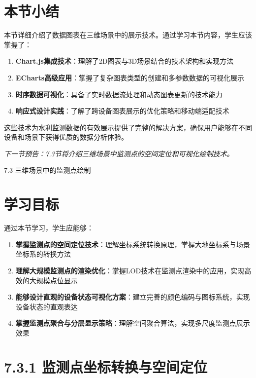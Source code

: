 \section{本节小结}

本节详细介绍了数据图表在三维场景中的展示技术。通过学习本节内容，学生应该掌握了：

\begin{enumerate}
\def\labelenumi{\arabic{enumi}.}
\tightlist
\item
  \textbf{Chart.js集成技术}：理解了2D图表与3D场景结合的技术架构和实现方法
\item
  \textbf{ECharts高级应用}：掌握了复杂图表类型的创建和多参数数据的可视化展示
\item
  \textbf{时序数据可视化}：具备了实时数据流处理和动态图表更新的技术能力
\item
  \textbf{响应式设计实践}：了解了跨设备图表展示的优化策略和移动端适配技术
\end{enumerate}

这些技术为水利监测数据的有效展示提供了完整的解决方案，确保用户能够在不同设备和场景下获得优质的数据分析体验。

\emph{下一节预告：7.3节将介绍三维场景中监测点的空间定位和可视化绘制技术。}

 7.3 三维场景中的监测点绘制

\section{学习目标}

通过本节学习，学生应能够：

\begin{enumerate}
\def\labelenumi{\arabic{enumi}.}
\tightlist
\item
  \textbf{掌握监测点的空间定位技术}：理解坐标系统转换原理，掌握大地坐标系与场景坐标系的转换方法
\item
  \textbf{理解大规模监测点的渲染优化}：掌握LOD技术在监测点渲染中的应用，实现高效的大规模点位显示
\item
  \textbf{能够设计直观的设备状态可视化方案}：建立完善的颜色编码与图标系统，实现设备状态的直观表达
\item
  \textbf{掌握监测点聚合与分层显示策略}：理解空间聚合算法，实现多尺度监测点展示效果
\end{enumerate}

\section{7.3.1 监测点坐标转换与空间定位}

